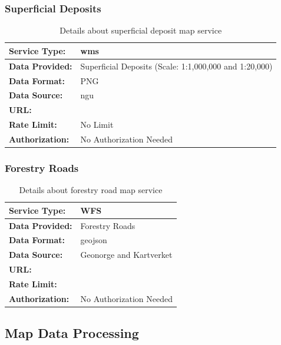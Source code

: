 \subsubsection*{Superficial Deposits}
\begin{table}[h]
    \centering
    \begin{tabularx}{\linewidth}{|l|X|}
        \hline
        \textbf{Service Type:} & \Gls{wms} \\
        \hline
        \textbf{Data Provided:} & Superficial Deposits (Scale: 1:1,000,000 and 1:20,000) \\
        \hline
        \textbf{Data Format:} & PNG \\
        \hline
        \textbf{Data Source:} & \acrshort{ngu} \\
        \hline
        \textbf{URL:} &  \\
        \hline
        \textbf{Rate Limit:} & No Limit \\
        \hline
        \textbf{Authorization:} & No Authorization Needed\\
        \hline
    \end{tabularx}
    \caption{Details about superficial deposit map service}
    \label{tab:superficial_deposit_map_service}
\end{table}

\subsubsection*{Forestry Roads}
\begin{table}[h]
    \centering
    \begin{tabularx}{\linewidth}{|l|X|}
        \hline
        \textbf{Service Type:} & WFS \\
        \hline
        \textbf{Data Provided:} & Forestry Roads \\
        \hline
        \textbf{Data Format:} & \Gls{geojson} \\
        \hline
        \textbf{Data Source:} & Geonorge and Kartverket \\
        \hline
        \textbf{URL:} &  \\
        \hline
        \textbf{Rate Limit:} &  \\
        \hline
        \textbf{Authorization:} & No Authorization Needed \\
        \hline
    \end{tabularx}
    \caption{Details about forestry road map service}
    \label{tab:forestry_road_map_service}
\end{table}


\subsection{Map Data Processing}

